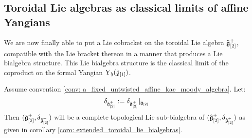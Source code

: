         \subsection{Toroidal Lie algebras as classical limits of affine Yangians}
            We are now finally able to put a Lie cobracket on the toroidal Lie algebra $\tilde{\mathfrak{g}}_{[2]}^+$, compatible with the Lie bracket thereon in a manner that produces a Lie bialgebra structure. This Lie bialgebra structure is the classical limit of the coproduct on the formal Yangian $\mathrm{Y}_{\mathfrak{h}}(\hat{\mathfrak{g}}_{[1]})$. 
            \begin{lemma} \label{lemma: toroidal_lie_bialgebras}
                Assume convention \ref{conv: a_fixed_untwisted_affine_kac_moody_algebra}. Let:
                    $$\delta_{\tilde{\mathfrak{g}}_{[2]}^+} := \delta_{\hat{\mathfrak{g}}_{[2]}^+}|_{\tilde{\mathfrak{g}}_{[2]}}$$
                Then $(\tilde{\mathfrak{g}}_{[2]}^+, \delta_{\tilde{\mathfrak{g}}_{[2]}^+})$ will be a complete topological Lie sub-bialgebra of $(\hat{\mathfrak{g}}_{[2]}^+, \delta_{\hat{\mathfrak{g}}_{[2]}^+})$ as given in corollary \ref{coro: extended_toroidal_lie_bialgebras}.
            \end{lemma}
